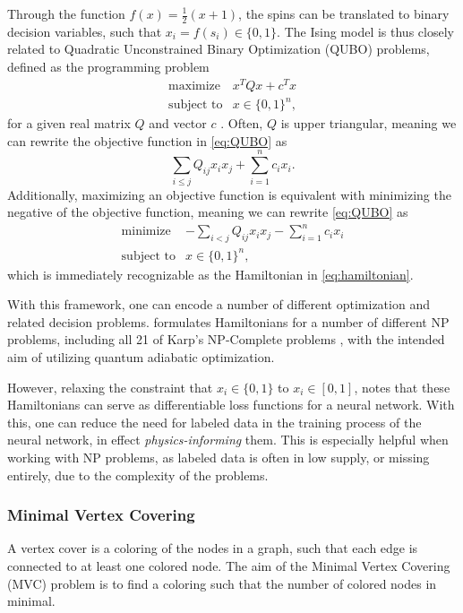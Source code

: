 Through the function $f(x) = \frac{1}{2}(x+1)$, the spins can be translated to binary decision variables, such that $x_i = f(s_i) \in \{0, 1\}$.
The Ising model is thus closely related to Quadratic Unconstrained Binary Optimization (QUBO) problems, defined as the programming problem
\begin{equation}\label{eq:QUBO}
\begin{array}{rl}
    \text{maximize} & x^T Q x + c^T x \\
    \text{subject to} & x \in \{0, 1\}^n,
\end{array}
\end{equation}
for a given real matrix $Q$ and vector $c$ \cite[p.~1--7]{PunnenAbrahamP2022TQUB}.
Often, $Q$ is upper triangular, meaning we can rewrite the objective function in \eqref{eq:QUBO} as
\begin{equation}
    \sum_{i \leq j} Q_{ij} x_i x_j + \sum_{i = 1}^n c_i x_i.
\end{equation}
Additionally, maximizing an objective function is equivalent with minimizing the negative of the objective function, meaning we can rewrite \eqref{eq:QUBO} as
\begin{equation}
\begin{array}{rl}
    \text{minimize} & \displaystyle -\sum_{i < j} Q_{ij} x_i x_j - \sum_{i = 1}^n c_i x_i \\
    \text{subject to} & x \in \{0, 1\}^n,
\end{array}
\end{equation}
which is immediately recognizable as the Hamiltonian in \eqref{eq:hamiltonian}.

With this framework, one can encode a number of different optimization and related decision problems.
\textcite{IsingFormulations} formulates Hamiltonians for a number of different NP problems, including all 21 of Karp's NP-Complete problems \cite{Karp2010}, with the intended aim of utilizing quantum adiabatic optimization.

However, relaxing the constraint that $x_i \in \{0, 1\}$ to $x_i \in [0, 1]$, \textcite{Schuetz_2022} notes that these Hamiltonians can serve as differentiable loss functions for a neural network.
With this, one can reduce the need for labeled data in the training process of the neural network, in effect \textit{physics-informing} them.
This is especially helpful when working with NP problems, as labeled data is often in low supply, or missing entirely, due to the complexity of the problems.

\subsubsection{Minimal Vertex Covering}
A vertex cover is a coloring of the nodes in a graph, such that each edge is connected to at least one colored node.
The aim of the Minimal Vertex Covering (MVC) problem is to find a coloring such that the number of colored nodes in minimal.

